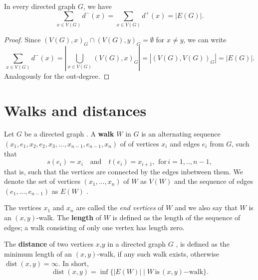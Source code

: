 \begin{proposition}
  In every directed graph $G$, we have
  \[
  \sum_{x \in V(G)} d^-(x) = \sum_{x \in V(G)} d^+(x) = | E(G) |.
  \]
\end{proposition}

\begin{proof}
  Since $(V(G),x)_G \cap (V(G),y)_G = \emptyset$ for $x \ne y$, we can
  write
  \[
  \sum_{x \in V(G)} d^-(x) = \left| \bigcup_{x \in V(G)} (V(G),x)_G
  \right| = \left| (V(G),V(G))_G \right| = | E(G) |.
  \]
  Analogously for the out-degree.
\end{proof}










\section{Walks and distances}\label{sec:walks_and_distances}


Let $G$ be a directed graph . A
\textbf{walk} $W$ in $G$ is an alternating sequence
$(x_1,e_1,x_2,e_2,x_3,\ldots,x_{n-1},e_{n-1},x_n)$ of of vertices
$x_i$ and edges $e_i$ from $G$, such that
\[
s(e_i) = x_i \quad \mathrm{and} \quad t(e_i) = x_{i+1}, \:\,
\mathrm{for}\, i=1,..,n-1,
\]
that is, such that the vertices are connected by the edges inbetween
them. We denote the set of vertices $(x_1,\ldots,x_n)$ of $W$ as
$V(W)$ and the sequence of edges $(e_1,\dots,e_{n-1})$ as $E(W)$
.

The vertices $x_1$ and $x_n$ are called the \textit{end vertices} of
$W$ and we also say that $W$ is an $(x,y)$-walk. The \textbf{length}
of $W$ is defined as the length of the sequence of edges; a walk
consisting of only one vertex has length zero. 


\begin{definition}[Distance]
  The \textbf{distance} of two vertices $x$,$y$ in a directed graph
  $G$ , is defined as the minimum length of an
  $(x,y)$-walk, if any such walk exists, otherwise
  $\operatorname{dist}(x,y)=\infty$. In short,
  \[
  \operatorname{dist}(x,y) = \inf \{|E(W)| \mid
  W\,\mathrm{is}\,(x,y)\mathrm{-walk}\}.
  \]
\end{definition}

